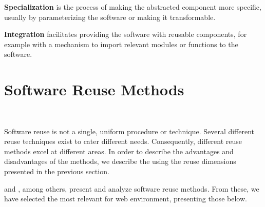 \textbf{Specialization} is the process of making the abstracted component more specific, usually by parameterizing the software or making it transformable.\newline

\textbf{Integration} facilitates providing the software with reusable components, for example with a mechanism to import relevant modules or functions to the software.\newline


\section{Software Reuse Methods}



~

Software reuse is not a single, uniform procedure or technique. Several different reuse techniques exist to cater different needs. Consequently, different reuse methods excel at different areas. In order to describe the advantages and disadvantages of the methods, we describe the using the reuse dimensions presented in the previous section.

\citet{krueger_software_1992} and \citet{johnson_frameworkscomponents+_1997}, among others, present and analyze software reuse methods. From these, we have selected the most relevant for web environment, presenting those below.



